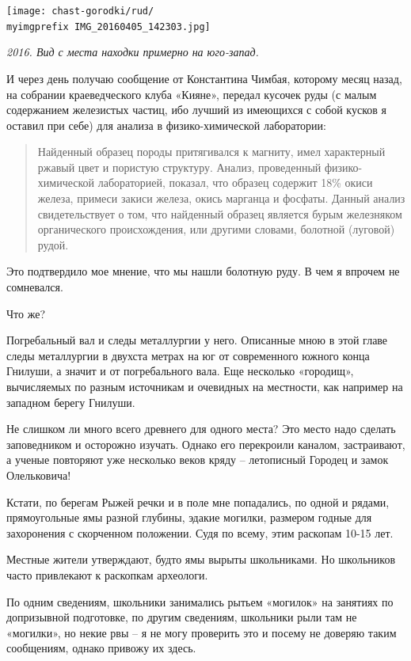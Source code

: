\begin{center}
\texttt{[image: chast-gorodki/rud/\\myimgprefix IMG\_20160405\_142303.jpg]}

\textit{2016. Вид с места находки примерно на юго-запад.}
\end{center}

И через день получаю сообщение от Константина Чимбая, которому месяц назад, на собрании краеведческого клуба «Кияне», передал кусочек руды (с малым содержанием железистых частиц, ибо лучший из имеющихся с собой кусков я оставил при себе) для анализа в фи\-зи\-ко-химической лаборатории:

\begin{quotation}
Найденный образец породы притягивался к магниту, имел характерный ржавый цвет и пористую структуру. Анализ, проведенный физи\-ко-химической лабораторией, показал, что образец содержит 18\% окиси железа, примеси закиси железа, окись марганца и фосфаты. Данный анализ свидетельствует о том, что найденный образец является бурым железняком органического происхождения, или другими словами, болотной (луговой) рудой.
\end{quotation}

Это подтвердило мое мнение, что мы нашли болотную руду. В чем я впрочем не сомневался.

Что же?

Погребальный вал и следы металлургии у него. Описанные мною в этой главе следы металлургии в двухста метрах на юг от современного южного конца Гнилуши, а значит и от погребального вала. Еще несколько «городищ», вычисляемых по разным источникам и очевидных на местности, как например на западном берегу Гнилуши.

Не слишком ли много всего древнего для одного места? Это место надо сделать заповедником и осторожно изучать. Однако его перекроили каналом, застраивают, а ученые повторяют уже несколько веков кряду – летописный Городец и замок Олельковича! 

Кстати, по берегам Рыжей речки и в поле мне попадались, по одной и рядами, прямоугольные ямы разной глубины, эдакие могилки, размером годные для захоронения с скорченном положении. Судя по всему, этим раскопам 10-15 лет.

Местные жители утверждают, будто ямы вырыты школьниками. Но школьников часто привлекают к раскопкам археологи.

По одним сведениям, школьники занимались рытьем «могилок» на занятиях по допризывной подготовке, по другим сведениям, школьники рыли там не «могилки», но некие рвы – я не могу проверить это и посему не доверяю таким сообщениям, однако привожу их здесь.

